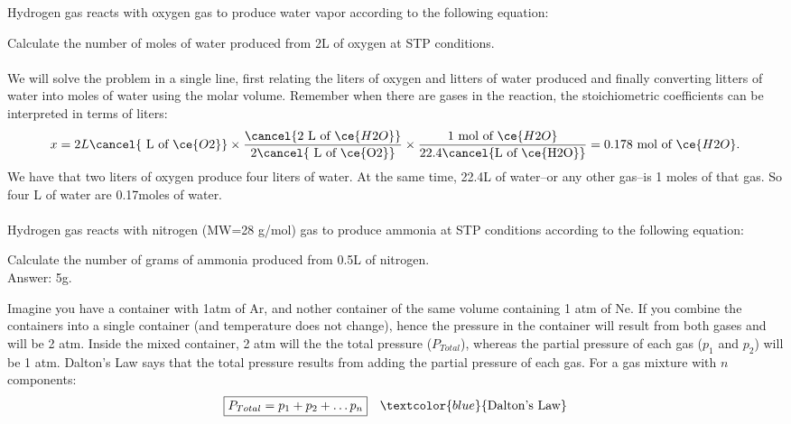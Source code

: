 \documentclass[main.tex]{subfiles}
\begin{document}
\begin{description}
\begin{example} %
Hydrogen gas reacts with oxygen gas to produce water vapor according to the following equation:
\begin{center} \end{center}
Calculate the number of moles of water produced from 2L of oxygen at STP conditions.
\\
\\
We will solve the problem in a single line, first relating the liters of oxygen and litters of water produced and finally converting litters of water into moles of water using the molar volume. Remember when there are gases in the reaction, the stoichiometric coefficients can be interpreted in terms of liters:
\begin{equation*}
x=2L\cancel{\text{ L of }\ce{O2}} \times \dfrac{\cancel{\text{2 L of }\ce{H2O}}}{2\cancel{\text{ L of \ce{O2}}}} \times   \dfrac{\text{1 mol of }\ce{H2O}}{22.4 \cancel{\text{L of \ce{H2O}}}}      =0.178\text{ mol of }\ce{H2O}.
\end{equation*}
We have that two liters of oxygen produce four liters of water. At the same time, 22.4L of water--or any other gas--is 1 moles of that gas. So four L of water are 0.17moles of water.
\\
\faDiamond\ \\
Hydrogen gas reacts with nitrogen (MW=28 g/mol) gas to produce ammonia at STP conditions according to the following equation:
\begin{center} \end{center}
Calculate the number of grams of ammonia produced from 0.5L of nitrogen.
\\
\flushright Answer: 5g.
\end{example}%
\item[\docfilehook{Partial and total pressure}{Partial and total pressure}] 
Imagine you have a container with 1atm of Ar, and nother container of the same volume containing 1 atm of Ne. If you combine the containers into a single container (and temperature does not change), hence the pressure in the container will result from both gases and will be 2 atm. Inside the mixed container, 2 atm will the the total pressure ($P_{Total}$), whereas the partial pressure of each gas ($p_{1}$ and $p_{2}$) will be 1 atm. Dalton's Law says that the total pressure results from adding the partial pressure of each gas. For a gas mixture with $n$ components:
\begin{equation*}
\boxed{  P_{Total}=p_1+p_2+\dots p_n} \quad \textcolor{blue}{\text{Dalton's Law}}
\end{equation*}



\end{description}
\end{document}
